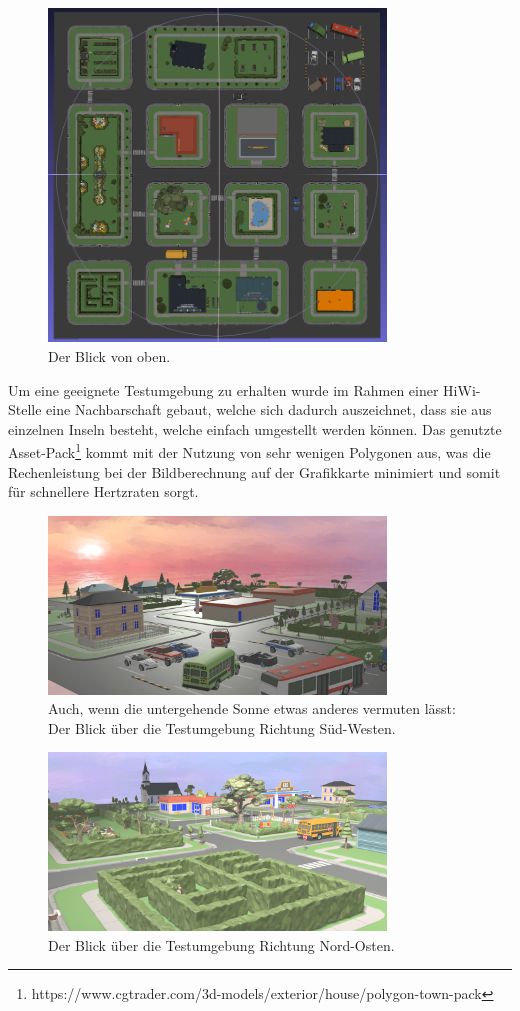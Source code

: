 \begin{figure}[h]
  \centering
  \includegraphics[width=0.8\textwidth]{images/WIM1.png}
  \caption{Der Blick von oben.}
  \label{fig:todo}
\end{figure}

Um eine geeignete Testumgebung zu erhalten wurde im Rahmen einer HiWi-Stelle eine Nachbarschaft gebaut, welche sich dadurch auszeichnet, dass sie aus einzelnen \glqq Inseln\grqq{} besteht, welche einfach umgestellt werden können. Das genutzte Asset-Pack\footnote{https://www.cgtrader.com/3d-models/exterior/house/polygon-town-pack} kommt mit der Nutzung von sehr wenigen Polygonen aus, was die Rechenleistung bei der Bildberechnung auf der Grafikkarte minimiert und somit für schnellere Hertzraten sorgt.

\begin{figure}[]
  \centering
  \includegraphics[width=0.8\textwidth]{images/map1.png}
  \caption{Auch, wenn die untergehende Sonne etwas anderes vermuten lässt: Der Blick über die Testumgebung Richtung Süd-Westen.}
  \label{fig:todo}
\end{figure}

\begin{figure}[h]
  \centering
  \includegraphics[width=0.8\textwidth]{images/map2.png}
  \caption{Der Blick über die Testumgebung Richtung Nord-Osten.}
  \label{fig:todo}
\end{figure}